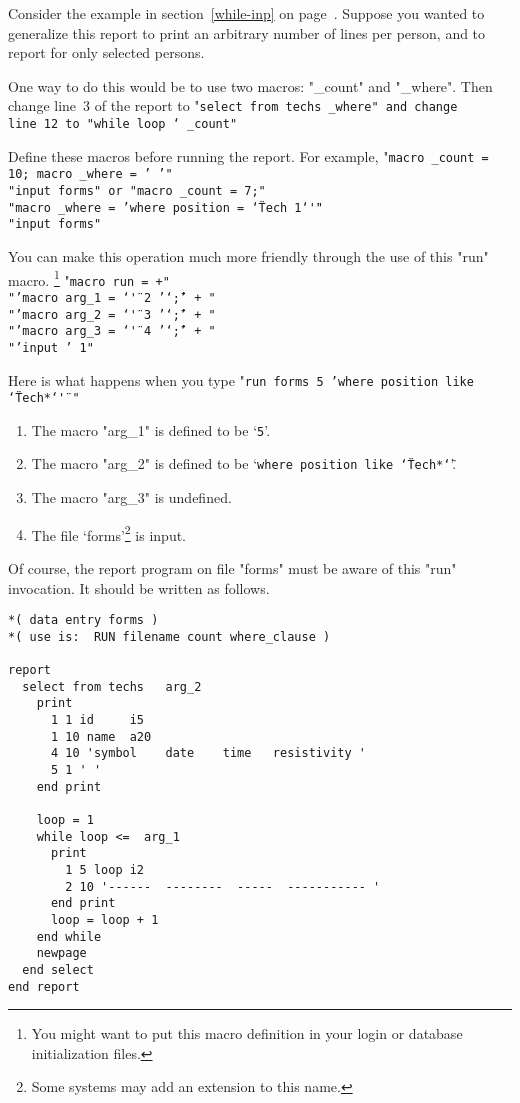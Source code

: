 Consider the example in section~\ref{while-inp}
on page~\pageref{while-inp}.
Suppose you wanted to generalize this report to print
an arbitrary number of lines per person, and
to report for only selected persons.
 
One way to do this would be to use
two macros: "_count" and "_where".
Then
change line~3 of the report to
\<"\tt select from techs _where"\>
and change line~12 to
\<"\tt while loop \char`\< _count"\>
 
Define these macros before running the report.
For example,
\<"\tt macro _count = 10; macro _where = ' '"\\
  "\tt input forms"\>
or
\<"\tt macro _count = 7;"\\
  "\tt macro _where = 'where position = \char`\"Tech 1\char`\"'"\\
  "\tt input forms"\>
 
\medskip
 
You can make this operation much more friendly through the use
of this "run" macro.%
\footnote{You might want to put this macro definition in your
  login or database initialization files.}
\<"\tt macro run = +"\\
  "\tt\qquad 'macro arg_1 = \char`\"' 2 '\char`\";' + "\\
  "\tt\qquad 'macro arg_2 = \char`\"' 3 '\char`\";' + "\\
  "\tt\qquad 'macro arg_3 = \char`\"' 4 '\char`\";' + "\\
  "\tt\qquad 'input ' 1"\>
 
Here is what happens when you type
\<"\tt run forms 5 'where position like \char`\"Tech*\char`\"' "\>
\begin{enumerate}
\item The macro "arg_1" is defined to be `{\tt5}'.
\item The macro "arg_2" is defined to be
      `{\tt where position like \char`\"Tech*\char`\"}'.
\item The macro "arg_3" is undefined.
\item The file `forms'\footnote{Some systems may add an
extension to this name.} is input.
 
\end{enumerate}
 
Of course, the report program on file "forms" must be aware of
this "run" invocation.  It should be written as follows.
 
\demobreak
\begin{verbatim}
*( data entry forms )
*( use is:  RUN filename count where_clause )
 
report
  select from techs   arg_2
    print
      1 1 id     i5
      1 10 name  a20
      4 10 'symbol    date    time   resistivity '
      5 1 ' '
    end print
 
    loop = 1
    while loop <=  arg_1
      print
        1 5 loop i2
        2 10 '------  --------  -----  ----------- '
      end print
      loop = loop + 1
    end while
    newpage
  end select
end report
\end{verbatim}
 
